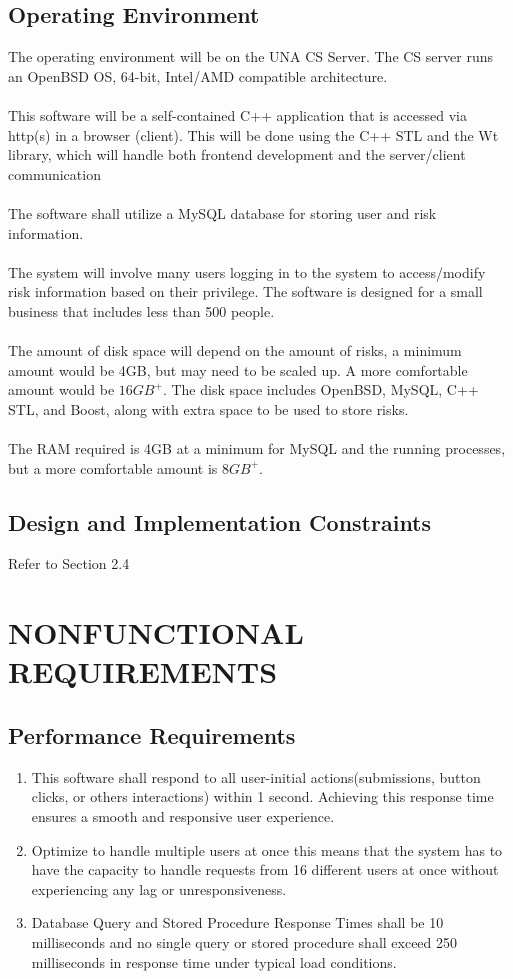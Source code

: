 \documentclass[letterpaper,12pt,oneside,listof=totoc]{scrreprt}
\begin{document}
\section{Operating Environment}
The operating environment will be on the UNA CS Server. The CS server runs an OpenBSD OS, 64-bit, Intel/AMD compatible architecture. \\ \\
This software will be a self-contained C++ application that is accessed via http(s) in a browser (client). This will be done using the C++ STL and the Wt library, which will handle both frontend development and the server/client communication \\ \\
The software shall utilize a MySQL database for storing user and risk information. \\ \\
The system will involve many users logging in to the system to access/modify risk information based on their privilege. The software is designed for a small business that includes less than 500 people.\\ \\
The amount of disk space will depend on the amount of risks, a minimum amount would be 4GB, but may need to be scaled up. A more comfortable amount would be $16GB^+$. The disk space includes OpenBSD, MySQL, C++ STL, and Boost, along with extra space to be used to store risks.\\ \\
The RAM required is 4GB at a minimum for MySQL and the running processes, but a more comfortable amount is $8GB^+$.

\section{Design and Implementation Constraints}
Refer to Section 2.4

\chapter{NONFUNCTIONAL REQUIREMENTS}

\section{Performance Requirements}
    \begin{enumerate}
        \item This software shall respond to all user-initial actions(submissions, button clicks, or others interactions) within 1 second. Achieving this response time ensures a smooth and responsive user experience. 
        \item Optimize to handle multiple users at once this means that the system has to have the capacity to handle requests from 16 different users at once without experiencing any lag or unresponsiveness.
        \item Database Query and Stored Procedure Response Times shall be 10 milliseconds and no single query or stored procedure shall exceed 250 milliseconds in response time under typical load conditions.
    \end{enumerate}
   
\end{document}
